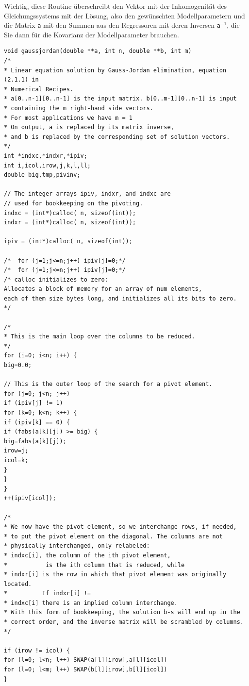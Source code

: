 Wichtig, diese Routine überschreibt den Vektor mit der Inhomogenität des Gleichungssystems
mit der Lösung, also den gewünschten Modellparametern und
die Matrix \texttt{a} mit den Summen aus den Regressoren mit deren Inversen
\texttt{a}$^{-1}$, die Sie dann für die Kovarianz der Modellparameter brauchen.

\begin{verbatim}
void gaussjordan(double **a, int n, double **b, int m)
/*
* Linear equation solution by Gauss-Jordan elimination, equation (2.1.1) in
* Numerical Recipes.
* a[0..n-1][0..n-1] is the input matrix. b[0..m-1][0..n-1] is input
* containing the m right-hand side vectors.
* For most applications we have m = 1
* On output, a is replaced by its matrix inverse,
* and b is replaced by the corresponding set of solution vectors.
*/
int *indxc,*indxr,*ipiv;
int i,icol,irow,j,k,l,ll;
double big,tmp,pivinv;

// The integer arrays ipiv, indxr, and indxc are
// used for bookkeeping on the pivoting.
indxc = (int*)calloc( n, sizeof(int));
indxr = (int*)calloc( n, sizeof(int));

ipiv = (int*)calloc( n, sizeof(int));

/*	for (j=1;j<=n;j++) ipiv[j]=0;*/
/*	for (j=1;j<=n;j++) ipiv[j]=0;*/
/* calloc initializes to zero:
Allocates a block of memory for an array of num elements,
each of them size bytes long, and initializes all its bits to zero.
*/

/*
* This is the main loop over the columns to be reduced.
*/
for (i=0; i<n; i++) {
big=0.0;

// This is the outer loop of the search for a pivot element.
for (j=0; j<n; j++)
if (ipiv[j] != 1)
for (k=0; k<n; k++) {
if (ipiv[k] == 0) {
if (fabs(a[k][j]) >= big) {
big=fabs(a[k][j]);
irow=j;
icol=k;
}
}
}
++(ipiv[icol]);

/*
* We now have the pivot element, so we interchange rows, if needed,
* to put the pivot element on the diagonal. The columns are not
* physically interchanged, only relabeled:
* indxc[i], the column of the ith pivot element,
*           is the ith column that is reduced, while
* indxr[i] is the row in which that pivot element was originally located.
*          If indxr[i] !=
* indxc[i] there is an implied column interchange.
* With this form of bookkeeping, the solution b-s will end up in the
* correct order, and the inverse matrix will be scrambled by columns.
*/

if (irow != icol) {
for (l=0; l<n; l++) SWAP(a[l][irow],a[l][icol])
for (l=0; l<m; l++) SWAP(b[l][irow],b[l][icol])
}


\end{verbatim}
